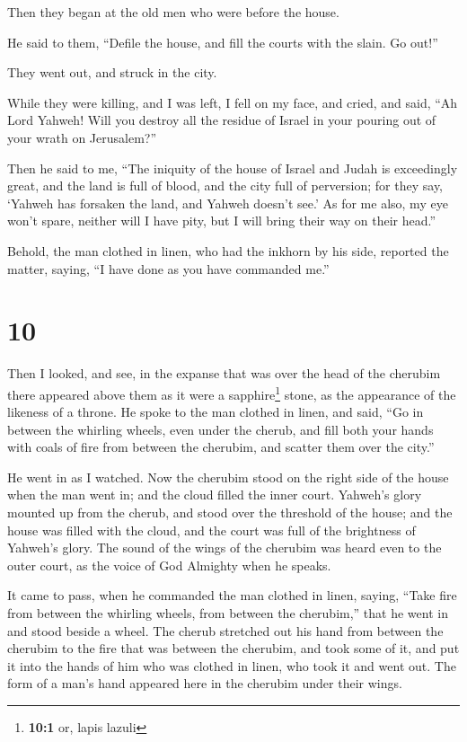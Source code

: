 Then they began at the old men who were before the house.

 He said to them, ``Defile the house, and fill the courts
with the slain. Go out!''

They went out, and struck in the city.

 While they were killing, and I was left, I fell on my
face, and cried, and said, ``Ah Lord Yahweh! Will you destroy all the
residue of Israel in your pouring out of your wrath on Jerusalem?''

 Then he said to me, ``The iniquity of the house of Israel
and Judah is exceedingly great, and the land is full of blood, and the
city full of perversion; for they say, `Yahweh has forsaken the land,
and Yahweh doesn't see.'  As for me also, my eye won't
spare, neither will I have pity, but I will bring their way on their
head.''

 Behold, the man clothed in linen, who had the inkhorn by
his side, reported the matter, saying, ``I have done as you have
commanded me.''

\hypertarget{section-8}{%
\section{10}\label{section-8}}

 Then I looked, and see, in the expanse that was over the
head of the cherubim there appeared above them as it were a
sapphire\footnote{\textbf{10:1} or, lapis lazuli} stone, as the
appearance of the likeness of a throne.  He spoke to the
man clothed in linen, and said, ``Go in between the whirling wheels,
even under the cherub, and fill both your hands with coals of fire from
between the cherubim, and scatter them over the city.''

He went in as I watched.  Now the cherubim stood on the
right side of the house when the man went in; and the cloud filled the
inner court.  Yahweh's glory mounted up from the cherub,
and stood over the threshold of the house; and the house was filled with
the cloud, and the court was full of the brightness of Yahweh's glory.
 The sound of the wings of the cherubim was heard even to
the outer court, as the voice of God Almighty when he speaks.

 It came to pass, when he commanded the man clothed in
linen, saying, ``Take fire from between the whirling wheels, from
between the cherubim,'' that he went in and stood beside a wheel.
 The cherub stretched out his hand from between the
cherubim to the fire that was between the cherubim, and took some of it,
and put it into the hands of him who was clothed in linen, who took it
and went out.  The form of a man's hand appeared here in
the cherubim under their wings.

